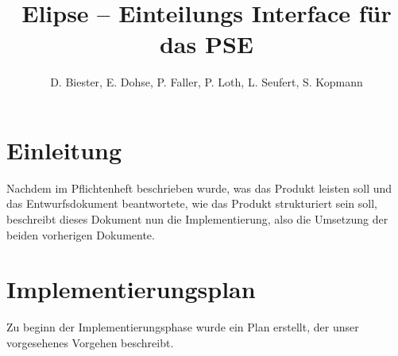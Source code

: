 \documentclass[parskip=full]{scrartcl}
\begin{document}
\title{Elipse -- Einteilungs Interface für das PSE}
\author{D. Biester, E. Dohse, P. Faller, P. Loth, L. Seufert, S. Kopmann}
\zweitgutachter{}
\mytitlepage
{\setlength{\textheight}{297mm}
\tableofcontents

\setlength{\textheight}{297mm}}
\pagebreak

\section{Einleitung}

Nachdem im Pflichtenheft beschrieben wurde, was das Produkt leisten soll und
das Entwurfsdokument beantwortete, wie das Produkt strukturiert sein soll, 
beschreibt dieses Dokument nun die Implementierung, also die Umsetzung der beiden vorherigen Dokumente.

\section{Implementierungsplan}
Zu beginn der Implementierungsphase wurde ein Plan erstellt, der unser
vorgesehenes Vorgehen beschreibt.
%
\end{document}
